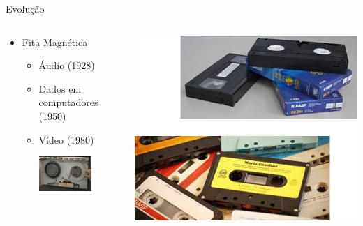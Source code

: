 \documentclass[aspectratio=169,
				xcolor=table]{beamer}
\begin{document}
	\begin{frame}{Evolução}
		\begin{columns}
			\begin{column}{0.5\textwidth}
				\begin{itemize}
					\item Fita Magnética
					\begin{itemize}
						\item Áudio (1928)
						\item Dados em computadores (1950) 
						\item Vídeo (1980)
						
					\vspace{1em}	\includegraphics[width=0.65\textwidth, keepaspectratio]{../figs/cap08/fita01.png}
					\end{itemize}
				\end{itemize}
			\end{column}
			\begin{column}{0.5\textwidth}
				\includegraphics[height=0.7\textheight, keepaspectratio]{../figs/cap08/fita02.png}
			\end{column}
		\end{columns}
	\end{frame}
	
\end{document}
